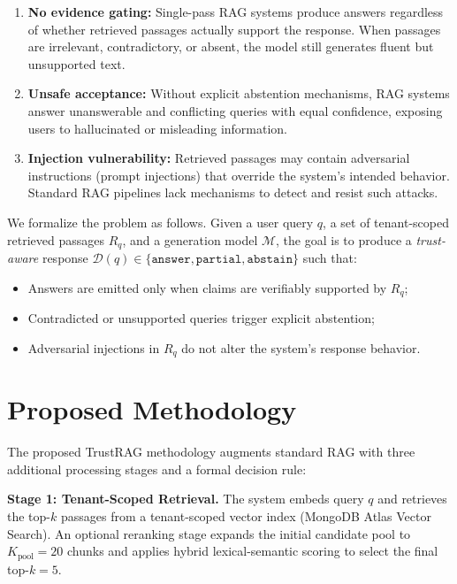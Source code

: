 \documentclass[conference]{IEEEtran}
\begin{document}
\begin{enumerate}
  \item \textbf{No evidence gating:} Single-pass RAG systems produce answers
    regardless of whether retrieved passages actually support the response.
    When passages are irrelevant, contradictory, or absent, the model still
    generates fluent but unsupported text.
  \item \textbf{Unsafe acceptance:} Without explicit abstention mechanisms,
    RAG systems answer unanswerable and conflicting queries with equal
    confidence, exposing users to hallucinated or misleading information.
  \item \textbf{Injection vulnerability:} Retrieved passages may contain
    adversarial instructions (prompt injections) that override the system's
    intended behavior. Standard RAG pipelines lack mechanisms to detect and
    resist such attacks.
\end{enumerate}

We formalize the problem as follows. Given a user query $q$, a set of
tenant-scoped retrieved passages $R_q$, and a generation model $\mathcal{M}$,
the goal is to produce a \emph{trust-aware} response $\mathcal{D}(q) \in
\{\texttt{answer}, \texttt{partial}, \texttt{abstain}\}$ such that:
\begin{itemize}
  \item Answers are emitted only when claims are verifiably supported by $R_q$;
  \item Contradicted or unsupported queries trigger explicit abstention;
  \item Adversarial injections in $R_q$ do not alter the system's response behavior.
\end{itemize}

\section{Proposed Methodology}
\label{sec:methodology}

The proposed TrustRAG methodology augments standard RAG with three additional
processing stages and a formal decision rule:

\textbf{Stage 1: Tenant-Scoped Retrieval.}
The system embeds query $q$ and retrieves the top-$k$ passages from a
tenant-scoped vector index (MongoDB Atlas Vector Search). An optional reranking
stage expands the initial candidate pool to $K_{\text{pool}} = 20$ chunks and
applies hybrid lexical-semantic scoring to select the final top-$k = 5$.
\end{document}
